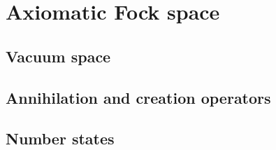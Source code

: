 \section{Axiomatic Fock space}

\subsection{Vacuum space}

\subsection{Annihilation and creation operators}

\subsection{Number states}